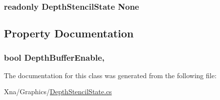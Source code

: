 \subsubsection[{None}]{\setlength{\rightskip}{0pt plus 5cm}readonly {\bf Depth\+Stencil\+State} None\hspace{0.3cm}{\ttfamily [static]}}\label{classMicrosoft_1_1Xna_1_1Framework_1_1Graphics_1_1DepthStencilState_a7c781654f248acd08b647a2b2534664a}


\subsection{Property Documentation}
\hypertarget{classMicrosoft_1_1Xna_1_1Framework_1_1Graphics_1_1DepthStencilState_a59f2103cdc1fd7535663caba83e16b2a}{}
\subsubsection[{Depth\+Buffer\+Enable}]{\setlength{\rightskip}{0pt plus 5cm}bool Depth\+Buffer\+Enable\hspace{0.3cm}{\ttfamily [get]}, {\ttfamily [set]}}\label{classMicrosoft_1_1Xna_1_1Framework_1_1Graphics_1_1DepthStencilState_a59f2103cdc1fd7535663caba83e16b2a}


The documentation for this class was generated from the following file\+:\begin{DoxyCompactItemize}
\item 
Xna/\+Graphics/\hyperlink{DepthStencilState_8cs}{Depth\+Stencil\+State.\+cs}\end{DoxyCompactItemize}
